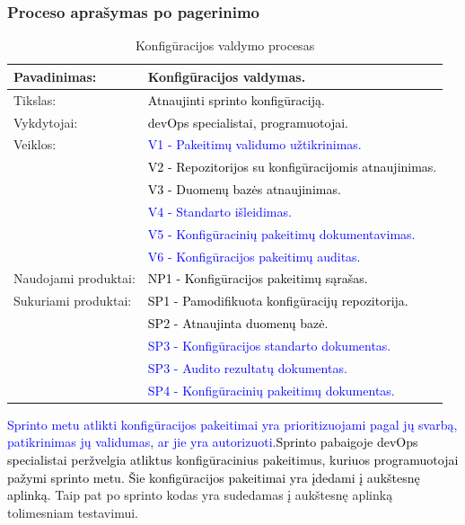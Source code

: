 \documentclass{VUMIFPSkursinis}
\begin{document}
			\subsubsection{Proceso aprašymas po pagerinimo}
			\begin{center}
				\begin{table}[ht]
					\caption{Konfigūracijos valdymo procesas}
					\begin{tabular}{ | l | l | }
						\hline
						Pavadinimas:         & Konfigūracijos valdymas.				\\ \hline
						Tikslas:             & \textcolor{black}{Atnaujinti sprinto konfigūraciją.}			\\ \hline
						Vykdytojai:          & \textcolor{black}{devOps specialistai, programuotojai.}			\\ \hline
						Veiklos:             	& \textcolor{blue}{V1 - Pakeitimų validumo užtikrinimas.	}		\\ \hline
																& \textcolor{black}{V2 - Repozitorijos su konfigūracijomis atnaujinimas.}	\\
																 & \textcolor{black}{V3 - Duomenų bazės atnaujinimas.	}		\\ \hline
																 & \textcolor{blue}{V4 - Standarto išleidimas.	}		\\ \hline
																 & \textcolor{blue}{V5 - Konfigūracinių pakeitimų dokumentavimas.	}		\\ \hline
																 & \textcolor{blue}{V6 - Konfigūracijos pakeitimų auditas.	}		\\ \hline
						Naudojami produktai: & \textcolor{black}{NP1 - Konfigūracijos pakeitimų sąrašas.	}	\\ \hline
						Sukuriami produktai: & \textcolor{black}{SP1 - Pamodifikuota konfigūracijų repozitorija. }	\\
																 & \textcolor{black}{SP2 - Atnaujinta duomenų bazė. }			\\ \hline
																 & \textcolor{blue}{SP3 - Konfigūracijos standarto dokumentas. }			\\ \hline
																 & \textcolor{blue}{SP3 - Audito rezultatų dokumentas. }			\\ \hline
																 & \textcolor{blue}{SP4 - Konfigūracinių pakeitimų dokumentas. }			\\ \hline
					\end{tabular}
				\end{table}
			\end{center}
				\textcolor{blue}{Sprinto metu atlikti konfigūracijos pakeitimai yra prioritizuojami pagal jų svarbą, patikrinimas jų validumas, ar jie yra autorizuoti.}\textcolor{black}{Sprinto pabaigoje devOps specialistai peržvelgia atliktus konfigūracinius pakeitimus, kuriuos programuotojai pažymi sprinto metu.
				Šie konfigūracijos pakeitimai yra įdedami į aukštesnę aplinką.} Taip pat po sprinto kodas yra sudedamas į aukštesnę aplinką tolimesniam testavimui.
\end{document}
